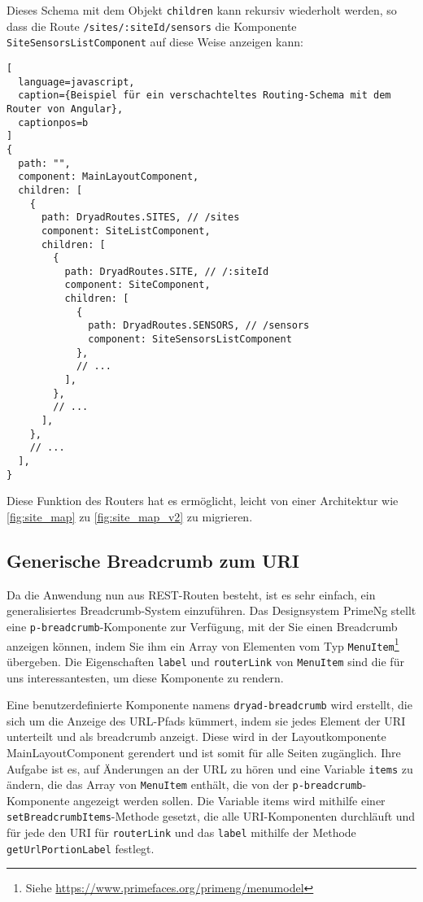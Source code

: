 Dieses Schema mit dem Objekt \lstinline{children} kann rekursiv wiederholt werden, so dass die Route \lstinline{/sites/:siteId/sensors} die Komponente \lstinline{SiteSensorsListComponent} auf diese Weise anzeigen kann:

\begin{lstlisting}[
  language=javascript,
  caption={Beispiel für ein verschachteltes Routing-Schema mit dem Router von Angular},
  captionpos=b
]
{
  path: "",
  component: MainLayoutComponent,
  children: [
    { 
      path: DryadRoutes.SITES, // /sites
      component: SiteListComponent,
      children: [
        { 
          path: DryadRoutes.SITE, // /:siteId
          component: SiteComponent,
          children: [
            { 
              path: DryadRoutes.SENSORS, // /sensors
              component: SiteSensorsListComponent
            },
            // ...
          ],
        },
        // ...
      ],
    },
    // ...
  ],
}
\end{lstlisting}

Diese Funktion des Routers hat es ermöglicht, leicht von einer Architektur wie \ref{fig:site_map} zu \ref{fig:site_map_v2} zu migrieren.

\subsection{Generische Breadcrumb zum URI}

Da die Anwendung nun aus \ac{REST}-Routen besteht, ist es sehr einfach, ein generalisiertes Breadcrumb-System einzuführen.
Das Designsystem PrimeNg stellt eine \lstinline{p-breadcrumb}-Komponente zur Verfügung, mit der Sie einen Breadcrumb anzeigen können, indem Sie ihm ein Array von Elementen vom Typ \lstinline{MenuItem}\footnote{Siehe \href{https://www.primefaces.org/primeng/menumodel}{https://www.primefaces.org/primeng/menumodel}} übergeben.
Die Eigenschaften \lstinline{label} und \lstinline{routerLink} von \lstinline{MenuItem} sind die für uns interessantesten, um diese Komponente zu rendern.

Eine benutzerdefinierte Komponente namens \lstinline{dryad-breadcrumb} wird erstellt, die sich um die Anzeige des \ac{URL}-Pfads kümmert, indem sie jedes Element der \ac{URI} unterteilt und als breadcrumb anzeigt.
Diese wird in der Layoutkomponente MainLayoutComponent gerendert und ist somit für alle Seiten zugänglich.
Ihre Aufgabe ist es, auf Änderungen an der \ac{URL} zu hören und eine Variable \lstinline{items} zu ändern, die das Array von \lstinline{MenuItem} enthält, die von der \lstinline{p-breadcrumb}-Komponente angezeigt werden sollen.
Die Variable items wird mithilfe einer \lstinline{setBreadcrumbItems}-Methode gesetzt, die alle \ac{URI}-Komponenten durchläuft und für jede den \ac{URI} für \lstinline{routerLink} und das \lstinline{label} mithilfe der Methode \lstinline{getUrlPortionLabel} festlegt.

